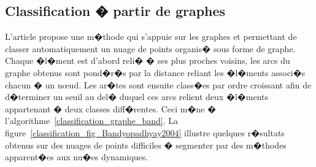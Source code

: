 \subsection{Classification � partir de graphes}
\label{classification_graphe_voisinage}


L'article  propose une m�thode qui s'appuie sur les graphes et permettant de classer automatiquement un nuage de points organis� sous forme de graphe. Chaque �l�ment est d'abord reli� � ses plus proches voisins, les arcs du graphe obtenus sont pond�r�s par la distance reliant les �l�ments associ�s chacun � un n\oe ud. Les ar�tes sont ensuite class�es par ordre croissant afin de d�terminer un seuil au del� duquel ces arcs relient deux �l�ments appartenant � deux classes diff�rentes. Ceci m�ne � l'algorithme~\ref{classification_graphe_band}. La figure~\ref{classification_fig_Bandyopadhyay2004} illustre quelques r�sultats obtenus sur des nuages de points difficiles � segmenter par des m�thodes apparent�es aux nu�es dynamiques.

